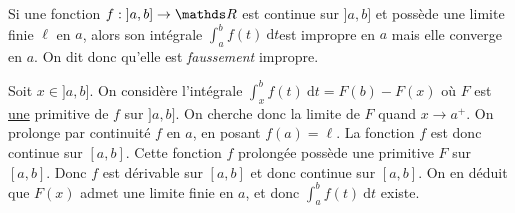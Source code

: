 \begin{prop}
	Si une fonction $f : {]a,b]} \to \R$\/ est continue sur $]a,b]$\/ et possède une limite finie $\ell$\/ en $a$, alors son intégrale $\int_{a}^{b} f(t)~\mathrm{d}t$\/est impropre en $a$\/ mais elle converge en $a$.
	On dit donc qu'elle est {\it faussement}\/ impropre.
\end{prop}

\begin{prv}
	Soit $x \in {]a,b]}$. On considère l'intégrale $\int_{x}^{b} f(t)~\mathrm{d}t = F(b) - F(x)$\/ où $F$\/ est \ul{une} primitive de $f$ sur $]a,b]$.
	On cherche donc la limite de $F$\/ quand $x \to a^+$.
	On prolonge par continuité $f$\/ en $a$, en posant $f(a) = \ell$.
	La fonction $f$\/ est donc continue sur $[a,b]$.
	Cette fonction $f$\/ prolongée possède une primitive $F$\/ sur $[a,b]$.
	Donc $f$\/ est dérivable sur $[a,b]$\/ et donc continue sur $[a,b]$.
	On en déduit que $F(x)$\/ admet une limite finie en $a$, et donc $\int_{a}^{b} f(t)~\mathrm{d}t$\/ existe.
\end{prv}

